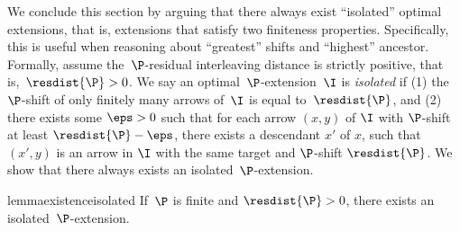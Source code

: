 We conclude this section by arguing that there always exist ``isolated'' optimal extensions, that is, extensions that satisfy two finiteness properties.
Specifically, this is useful when reasoning about ``greatest'' shifts and ``highest'' ancestor.
Formally, assume the~$\P$-residual interleaving distance is strictly positive, that is,~$\resdist{\P} > 0$.
We say an optimal~$\P$-extension~$\I$ is \emph{isolated} if (1) the~$\P$-shift of only finitely many arrows of~$\I$ is equal to~$\resdist{\P}$, and (2) there exists some $\eps>0$ such that for each arrow $(x,y)$ of $\I$ with $\P$-shift at least $\resdist{\P}-\eps$, there exists a descendant $x'$ of $x$, such that $(x',y)$ is an arrow in $\I$ with the same target and $\P$-shift $\resdist{\P}$.
We show that there always exists an isolated~$\P$-extension.
%
\begin{restatable}{lemma}{existenceisolated}
\label{lem:existence-isolated-extension}
  If~$\P$ is finite and $\resdist{\P}>0$, there exists an isolated~$\P$-extension.
\end{restatable}
